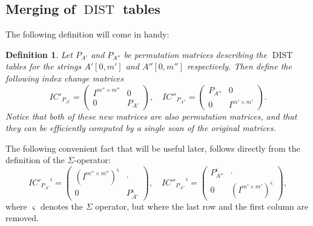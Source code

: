 \documentclass[twoside,11pt,openright]{report}
\newcommand{\DIST}{\operatorname{DIST}}
\newcommand{\str}[3]{#1[#2, #3]}
\newtheorem{mydef}{Definition}
\begin{document}
\subsection{Merging of $\DIST$ tables}
\label{sec:merging-dists}
The following definition will come in handy:
\begin{mydef}
  Let $P_{A'}$ and $P_{A''}$ be permutation matrices describing the $\DIST$ tables for the strings $\str{A'}{0}{m'}$ and $\str{A''}{0}{m''}$ respectively. Then define the following index change matrices
  \[
    IC'_{P_{A'}} = \begin{pmatrix}
      I^{m'' \times m''} & 0 \\
      0 & P_{A'}
    \end{pmatrix}, \quad
    IC''_{P_{A''}} = \begin{pmatrix}
      P_{A''} & 0 \\
      0 & I^{m' \times m'}
    \end{pmatrix}.
  \]
  Notice that both of these new matrices are also permutation matrices, and that they can be efficiently computed by a single scan of the original matrices.
\end{mydef}

The following convenient fact that will be useful later, follows directly from the definition of the $\Sigma$-operator:
\[
  {IC'_{P_{A'}}}^{\varsigma} = \begin{pmatrix}
    (I^{m'' \times m''})^{\varsigma} & \cdot \\
    0 & P_{A'}^{\varsigma}
  \end{pmatrix}, \quad
  {IC''_{P_{A''}}}^{\varsigma} = \begin{pmatrix}
    P_{A''}^{\varsigma} & \cdot \\
    0 & (I^{m' \times m'})^{\varsigma}
  \end{pmatrix},
\]
where $\varsigma$ denotes the $\Sigma$ operator, but where the last row and the first column are removed.
\end{document}
